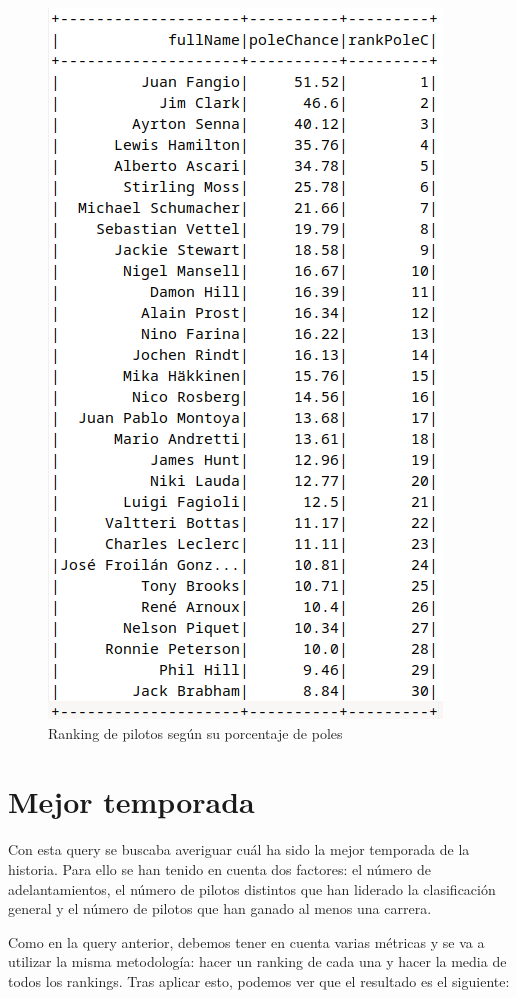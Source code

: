 \documentclass[12pt,twoside,titlepage]{report}
\begin{document}
\begin{figure}[H]
	\includegraphics[scale=0.3]{results/bestdrivers/polechance.png}
	\centering
	\caption{Ranking de pilotos según su porcentaje de poles}
	\label{fig:poleChance}
	\centering
\end{figure}

\section{Mejor temporada}

Con esta query se buscaba averiguar cuál ha sido la mejor temporada de la historia. Para ello se han tenido en cuenta dos factores: el número de adelantamientos, el número de pilotos distintos que han liderado la clasificación general y el número de pilotos que han ganado al menos una carrera.

Como en la query anterior, debemos tener en cuenta varias métricas y se va a utilizar la misma metodología: hacer un ranking de cada una y hacer la media de todos los rankings. Tras aplicar esto, podemos ver que el resultado es el siguiente:
\end{document}

